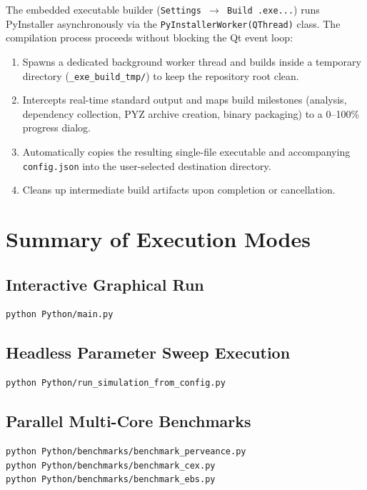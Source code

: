 \documentclass[11pt,a4paper]{article}
\begin{document}
The embedded executable builder (\texttt{Settings $\rightarrow$ Build .exe...}) runs PyInstaller asynchronously via the \texttt{PyInstallerWorker(QThread)} class. The compilation process proceeds without blocking the Qt event loop:
\begin{enumerate}[nosep]
    \item Spawns a dedicated background worker thread and builds inside a temporary directory (\texttt{\_exe\_build\_tmp/}) to keep the repository root clean.
    \item Intercepts real-time standard output and maps build milestones (analysis, dependency collection, PYZ archive creation, binary packaging) to a 0--100\% progress dialog.
    \item Automatically copies the resulting single-file executable and accompanying \texttt{config.json} into the user-selected destination directory.
    \item Cleans up intermediate build artifacts upon completion or cancellation.
\end{enumerate}

\section{Summary of Execution Modes}

\subsection{Interactive Graphical Run}
\begin{lstlisting}[language=bash]
python Python/main.py
\end{lstlisting}

\subsection{Headless Parameter Sweep Execution}
\begin{lstlisting}[language=bash]
python Python/run_simulation_from_config.py
\end{lstlisting}

\subsection{Parallel Multi-Core Benchmarks}
\begin{lstlisting}[language=bash]
python Python/benchmarks/benchmark_perveance.py
python Python/benchmarks/benchmark_cex.py
python Python/benchmarks/benchmark_ebs.py
\end{lstlisting}
\end{document}
